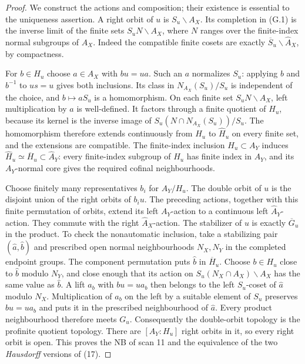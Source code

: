 \begin{proof}
We construct the actions and composition; their existence is essential
to the uniqueness assertion. A right orbit of $u$ is
$S_u\backslash A_X$. Its completion in (G.1) is the inverse limit of
the finite sets $S_uN\backslash A_X$, where $N$ ranges over the
finite-index normal subgroups of $A_X$. Indeed the compatible finite
cosets are exactly $\overline S_u\backslash\widehat A_X$, by compactness.

For $b\in H_u$ choose $a\in A_X$ with $bu=ua$. Such an $a$ normalizes
$S_u$: applying $b$ and $b^{-1}$ to $us=u$ gives both inclusions.
Its class in $N_{A_X}(S_u)/S_u$ is independent of the choice, and
$b\mapsto aS_u$ is a homomorphism. On each finite set
$S_uN\backslash A_X$, left multiplication by $a$ is well-defined.
It factors through a finite quotient of $H_u$, because its kernel is
the inverse image of $S_u(N\cap N_{A_X}(S_u))/S_u$. The homomorphism
therefore extends continuously from $H_u$ to $\widehat H_u$ on every
finite set, and the extensions are compatible. The finite-index
inclusion $H_u\subset A_Y$ induces
$\widehat H_u\simeq\overline H_u\subset\widehat A_Y$: every
finite-index subgroup of $H_u$ has finite index in $A_Y$, and its
$A_Y$-normal core gives the required cofinal neighbourhoods.

Choose finitely many representatives $b_i$ for $A_Y/H_u$. The double
orbit of $u$ is the disjoint union of the right orbits of $b_i u$.
The preceding actions, together with this finite permutation of
orbits, extend its left $A_Y$-action to a continuous left
$\widehat A_Y$-action. They commute with the right $\widehat A_X$-action.
The stabilizer of $u$ is exactly $\overline G_u$ in the product.
To check the nonautomatic inclusion, take a stabilizing pair
$(\widehat a,\widehat b)$ and prescribed open normal neighbourhoods
$N_X,N_Y$ in the completed endpoint groups. The component permutation
puts $\widehat b$ in $\overline H_u$. Choose $b\in H_u$ close to
$\widehat b$ modulo $N_Y$, and close enough that its action on
$S_u(N_X\cap A_X)\backslash A_X$ has the same value as
$\widehat b$. A lift $a_b$ with $bu=ua_b$ then belongs to the
left $S_u$-coset of $\widehat a$ modulo $N_X$. Multiplication of
$a_b$ on the left by a suitable element of $S_u$ preserves $bu=ua_b$
and puts it in the prescribed neighbourhood of $\widehat a$.
Every product neighbourhood therefore meets $G_u$.
Consequently the double-orbit topology is the profinite quotient
topology. There are $[A_Y:H_u]$ right orbits in it, so every right orbit
is open. This proves the NB of scan 11 and the equivalence of the two
\emph{Hausdorff} versions of (17).


\end{proof}
